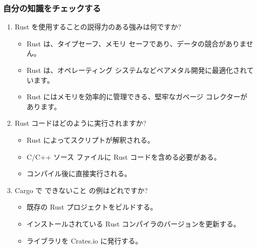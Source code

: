 \subsubsection{自分の知識をチェックする}

\begin{enumerate}
\item Rust を使用することの説得力のある強みは何ですか?
\begin{itemize}
\item Rust は、タイプセーフ、メモリ セーフであり、データの競合がありません。
\item Rust は、オペレーティング システムなどベアメタル開発に最適化されています。
\item Rust にはメモリを効率的に管理できる、堅牢なガベージ コレクターがあります。
\end{itemize}
\item Rust コードはどのように実行されますか?
\begin{itemize}
\item Rust によってスクリプトが解釈される。
\item C/C++ ソース ファイルに Rust コードを含める必要がある。
\item コンパイル後に直接実行される。
\end{itemize}
\item Cargo で できないこと の例はどれですか?
\begin{itemize}
\item 既存の Rust プロジェクトをビルドする。
\item インストールされている Rust コンパイラのバージョンを更新する。
\item ライブラリを Crates.io に発行する。
\end{itemize}
\end{enumerate}







